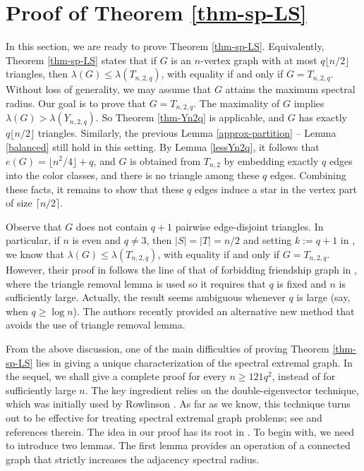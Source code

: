 \documentclass[11pt]{article}
\begin{document}
\section{Proof of Theorem  \ref{thm-sp-LS}}

\label{sec5}

In this section, we are ready to prove Theorem \ref{thm-sp-LS}. Equivalently,  Theorem \ref{thm-sp-LS} states that if $G$ is an $n$-vertex graph with at most $ q \lfloor {n}/{2}\rfloor$ triangles, then $\lambda (G)\le \lambda (T_{n,2,q})$, with equality if and only if $G=T_{n,2,q}$.   
Without loss of generality, we may assume that $G$ attains the maximum spectral radius.  Our goal is to prove that $G=T_{n,2,q}$.  
The maximality of $G$ implies $ \lambda (G) > \lambda (Y_{n,2,q}) $. So Theorem \ref{thm-Yn2q} is applicable, and  $G$ has exactly $q\lfloor {n}/{2}\rfloor$ 
triangles.
Similarly, the previous Lemma \ref{approx-partition} -- 
 Lemma \ref{balanced} still hold in this setting. 
By Lemma \ref{lessYn2q}, it follows that $e(G)= \lfloor n^2/4\rfloor +q$, and $G$ is obtained from $T_{n,2}$ by embedding 
exactly $q $ edges into the color classes, 
and there is no triangle among these $q$ edges.  
Combining these facts, 
it remains to show that these $q$ edges induce a star in the vertex part of size 
$\lceil {n}/{2}\rceil$. 

\medskip 
Observe that $G$ does not contain 
$q +1$  pairwise edge-disjoint triangles. 
In particular, if  $n$ is even and $q\neq 3$, 
then $|S|=|T|={n}/{2}$ and setting $k:=q+1$ in \cite[Theorem 7]{LZZ2022}, 
we know that $\lambda (G)\le \lambda (T_{n,2,q})$, 
with equality if and only if $G=T_{n,2,q}$.  
However, their proof in \cite{LZZ2022}  
follows the line of that of forbidding friendship graph in \cite{CFTZ20}, 
where the triangle removal lemma is used  
so it requires that $q$ is fixed and 
$n$ is sufficiently large. 
Actually,  the result seems ambiguous whenever $q$ is large 
(say, when $q\ge \log n$).   
The authors \cite{LFP2024-triangular} 
recently provided an alternative new method that 
avoids the use of triangle removal lemma. 

\medskip 
From the above discussion, 
one of the main difficulties of proving Theorem \ref{thm-sp-LS}  lies in 
giving a unique characterization of the spectral extremal graph. 
In the sequel, we shall  give a complete 
proof for every $n\ge 121q^2$, instead of for sufficiently large $n$.  
The key ingredient relies on the double-eigenvector technique, 
which was initially used by Rowlinson \cite{Row1988}.  
As far as we know, this technique turns out to be effective 
for treating spectral extremal graph problems; see \cite{ZLX2022,LZZ2022,FTZ2024,LLZ2024,ZFL2024} and references therein. 
The idea in our proof has its root in \cite{LZZ2022,FTZ2024}. 
To begin with, we need to introduce two lemmas. 
The first lemma  provides an operation of a connected graph that strictly increases the adjacency spectral radius. 
\end{document}
